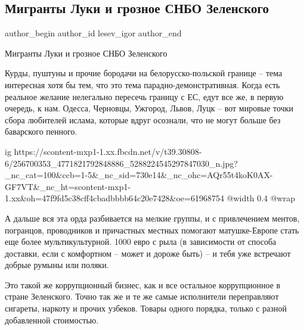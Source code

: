  
 
 
 
 
 
\subsection{Мигранты Луки и грозное СНБО Зеленского}
\label{sec:12_11_2021.fb.lesev_igor.1.migranty_rnbo_zelja}
 
\ifcmt
 author_begin
   author_id lesev_igor
 author_end
\fi

Мигранты Луки и грозное СНБО Зеленского

Курды, пуштуны и прочие бородачи на белорусско-польской границе – тема
интересная хотя бы тем, что это тема парадно-демонстративная. Когда есть
реальное желание нелегально пересечь границу с ЕС, едут все же, в первую
очередь, к нам. Одесса, Черновцы, Ужгород, Львов, Луцк – вот мировые точки
сбора любителей ислама, которые вдруг осознали, что не могут больше без
баварского пенного.

\ifcmt
  ig https://scontent-mxp1-1.xx.fbcdn.net/v/t39.30808-6/256700353_4771821792848886_5288224545297847030_n.jpg?_nc_cat=100&ccb=1-5&_nc_sid=730e14&_nc_ohc=AQr55t4koK0AX-GF7VT&_nc_ht=scontent-mxp1-1.xx&oh=47f9fd5c38cff4cbadbbbb64c20e7428&oe=61968754
  @width 0.4
  @wrap 
\fi

А дальше вся эта орда разбивается на мелкие группы, и с привлечением ментов,
погранцов, проводников и причастных местных помогают матушке-Европе стать еще
более мультикультурной. 1000 евро с рыла (в зависимости от способа доставки,
если с комфортном – может и дороже быть) – и тебя уже встречают добрые румыны
или поляки.

Это такой же коррупционный бизнес, как и все остальное коррупционное в стране
Зеленского. Точно так же и те же самые исполнители переправляют сигареты,
наркоту и прочих узбеков. Товары одного порядка, только с разной добавленной
стоимостью.

